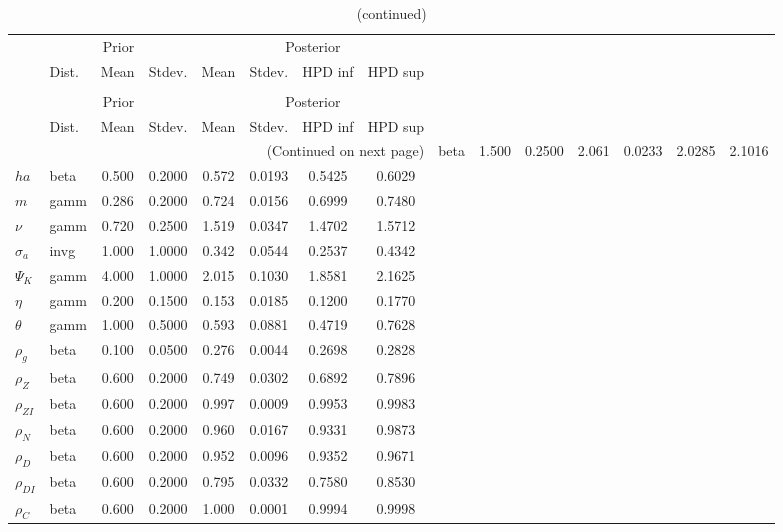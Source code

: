  
\begin{center}
\begin{longtable}{llcccccc} 
\caption{Results from Metropolis-Hastings (parameters)}
 \label{Table:MHPosterior:1}\\
\toprule 
  & \multicolumn{3}{c}{Prior}  &  \multicolumn{4}{c}{Posterior} \\
  \cmidrule(r{.75em}){2-4} \cmidrule(r{.75em}){5-8}
  & Dist. & Mean  & Stdev. & Mean & Stdev. & HPD inf & HPD sup\\
\midrule \endfirsthead 
\caption{(continued)}\\\toprule 
  & \multicolumn{3}{c}{Prior}  &  \multicolumn{4}{c}{Posterior} \\
  \cmidrule(r{.75em}){2-4} \cmidrule(r{.75em}){5-8}
  & Dist. & Mean  & Stdev. & Mean & Stdev. & HPD inf & HPD sup\\
\midrule \endhead 
\bottomrule \multicolumn{8}{r}{(Continued on next page)} \endfoot 
\bottomrule \endlastfoot 
${\gamma}$ & beta &   1.500 & 0.2500 &   2.061& 0.0233 &  2.0285 &  2.1016 \\ 
${ha}$ & beta &   0.500 & 0.2000 &   0.572& 0.0193 &  0.5425 &  0.6029 \\ 
${m}$ & gamm &   0.286 & 0.2000 &   0.724& 0.0156 &  0.6999 &  0.7480 \\ 
$\nu$ & gamm &   0.720 & 0.2500 &   1.519& 0.0347 &  1.4702 &  1.5712 \\ 
${\sigma_a}$ & invg &   1.000 & 1.0000 &   0.342& 0.0544 &  0.2537 &  0.4342 \\ 
${\Psi_K}$ & gamm &   4.000 & 1.0000 &   2.015& 0.1030 &  1.8581 &  2.1625 \\ 
${\eta}$ & gamm &   0.200 & 0.1500 &   0.153& 0.0185 &  0.1200 &  0.1770 \\ 
${\theta}$ & gamm &   1.000 & 0.5000 &   0.593& 0.0881 &  0.4719 &  0.7628 \\ 
${\rho_g}$ & beta &   0.100 & 0.0500 &   0.276& 0.0044 &  0.2698 &  0.2828 \\ 
${\rho_Z}$ & beta &   0.600 & 0.2000 &   0.749& 0.0302 &  0.6892 &  0.7896 \\ 
${\rho_{ZI}}$ & beta &   0.600 & 0.2000 &   0.997& 0.0009 &  0.9953 &  0.9983 \\ 
${\rho_N}$ & beta &   0.600 & 0.2000 &   0.960& 0.0167 &  0.9331 &  0.9873 \\ 
${\rho_D}$ & beta &   0.600 & 0.2000 &   0.952& 0.0096 &  0.9352 &  0.9671 \\ 
${\rho_{DI}}$ & beta &   0.600 & 0.2000 &   0.795& 0.0332 &  0.7580 &  0.8530 \\ 
${\rho_C}$ & beta &   0.600 & 0.2000 &   1.000& 0.0001 &  0.9994 &  0.9998 \\ 
\end{longtable}
 \end{center}
